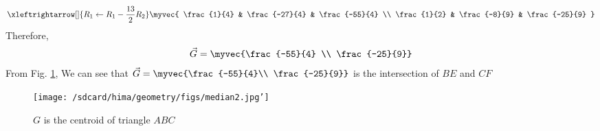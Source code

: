 \documentclass[11pt]{book}
\begin{document}
\begin{enumerate}[label=\thesection.\arabic*.,ref=\thesection.\theenumi]
\begin{align}
{    }
    \\
     \xleftrightarrow[]{R_1\leftarrow R_1-\frac{13}{2}R_2}
    \myvec{
    \frac{1}{4} & \frac{-27}{4} & \frac{-55}{4}
    \\
    \frac{1}{2} & \frac{-8}{9} & \frac{-25}{9}
    }
\end{align} 
Therefore, 
\begin{align}
\vec{G} = \myvec{\frac{-55}{4} \\ \frac{-25}{9}}
\end{align}
From Fig. \ref{fig:Triangle101}, We can see that $\vec{G}=\myvec{\frac{-55}{4}\\ \frac{-25}{9}}$ is the intersection of $BE$ and $CF$
\begin{figure}[h]
\centering
\texttt{[image: /sdcard/hima/geometry/figs/median2.jpg']}
\caption{$G$ is the centroid of triangle $ABC$}
\label{fig:Triangle101}
\end{figure}




\end{enumerate}
\end{document}
